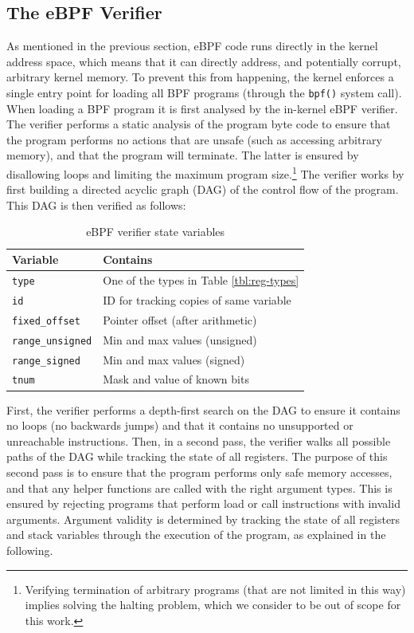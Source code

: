 \documentclass[10pt,sigconf,anonymous]{acmart}
\begin{document}
\subsection{The eBPF Verifier}
\label{sec:bpf-verifier}
As mentioned in the previous section, eBPF code runs directly in the kernel
address space, which means that it can directly address, and potentially
corrupt, arbitrary kernel memory. To prevent this from happening, the kernel
enforces a single entry point for loading all BPF programs (through the
\texttt{bpf()} system call). When loading a BPF program it is first analysed by
the in-kernel eBPF verifier. The verifier performs a static analysis of the
program byte code to ensure that the program performs no actions that are unsafe
(such as accessing arbitrary memory), and that the program will terminate. The
latter is ensured by disallowing loops and limiting the maximum program
size.\footnote{Verifying termination of arbitrary programs (that are not limited
  in this way) implies solving the halting problem, which we consider to be out
  of scope for this work.} The verifier works by first building a directed
acyclic graph (DAG) of the control flow of the program. This DAG is then
verified as follows:

\begin{table}[tbp]
\caption{\label{tbl:vrf-state-vars}
eBPF verifier state variables}
\centering
\begin{tabular}{ll}
\toprule
Variable & Contains\\
\midrule
\texttt{type} & One of the types in Table \ref{tbl:reg-types}\\
\texttt{id} & ID for tracking copies of same variable\\
\texttt{fixed\_offset} & Pointer offset (after arithmetic)\\
\texttt{range\_unsigned} & Min and max values (unsigned)\\
\texttt{range\_signed} & Min and max values (signed)\\
\texttt{tnum} & Mask and value of known bits\\
\bottomrule
\end{tabular}
\end{table}

First, the verifier performs a depth-first search on the DAG to ensure it
contains no loops (no backwards jumps) and that it contains no unsupported or
unreachable instructions. Then, in a second pass, the verifier walks all
possible paths of the DAG while tracking the state of all registers. The purpose
of this second pass is to ensure that the program performs only safe memory
accesses, and that any helper functions are called with the right argument
types. This is ensured by rejecting programs that perform load or call
instructions with invalid arguments. Argument validity is determined by tracking
the state of all registers and stack variables through the execution of the
program, as explained in the following.
\end{document}
